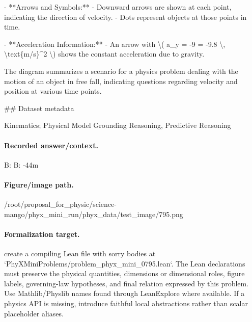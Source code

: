 - **Arrows and Symbols:**
  - Downward arrows are shown at each point, indicating the direction of velocity.
  - Dots represent objects at those points in time.

- **Acceleration Information:**
  - An arrow with \textbackslash{}( a\_y = -9 = -9.8 \textbackslash{}, \textbackslash{}text\{m/s\}\textasciicircum{}2 \textbackslash{}) shows the constant acceleration due to gravity.

The diagram summarizes a scenario for a physics problem dealing with the motion of an object in free fall, indicating questions regarding velocity and position at various time points.

\#\# Dataset metadata

Kinematics; Physical Model Grounding Reasoning, Predictive Reasoning

\paragraph{Recorded answer/context.}
B: B: -44m

\paragraph{Figure/image path.}
/root/proposal\_for\_physic/science-mango/phyx\_mini\_run/phyx\_data/test\_image/795.png

\paragraph{Formalization target.}
create a compiling Lean file with sorry bodies at `PhyXMiniProblems/problem\_phyx\_mini\_0795.lean`. The Lean declarations must preserve the physical quantities, dimensions or dimensional roles, figure labels, governing-law hypotheses, and final relation expressed by this problem.
Use Mathlib/Physlib names found through LeanExplore where available. If a physics API is missing, introduce faithful local abstractions rather than scalar placeholder aliases.

